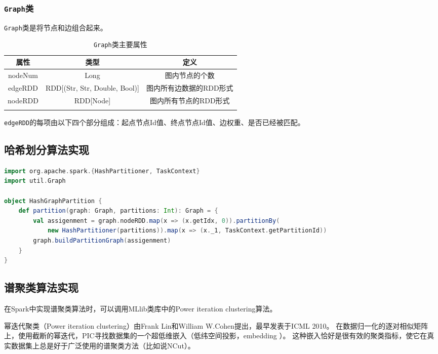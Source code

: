 \subsubsection{\texttt{Graph}类}

\texttt{Graph}类是将节点和边组合起来。

\begin{table}[htbp]
    \centering
    \caption{\texttt{Graph}类主要属性}
    \begin{tabular}{ccc}
        \hline
        属性& 类型 & 定义\\
        \hline
        nodeNum & Long & 图内节点的个数 \\
        edgeRDD & RDD[(Str, Str, Double, Bool)] & 图内所有边数据的RDD形式\\
        nodeRDD & RDD[Node] & 图内所有节点的RDD形式\\
        \hline
        \centering
    \end{tabular}
\end{table}

\texttt{edgeRDD}的每项由以下四个部分组成：起点节点Id值、终点节点Id值、边权重、是否已经被匹配。

\subsection{哈希划分算法实现}

\begin{lstlisting}[language=Scala]
import org.apache.spark.{HashPartitioner, TaskContext}
import util.Graph

object HashGraphPartition {
    def partition(graph: Graph, partitions: Int): Graph = {
        val assigenment = graph.nodeRDD.map(x => (x.getIdx, 0)).partitionBy(
            new HashPartitioner(partitions)).map(x => (x._1, TaskContext.getPartitionId))
        graph.buildPartitionGraph(assigenment)
    }
}
\end{lstlisting}

\subsection{谱聚类算法实现}

在Spark中实现谱聚类算法时，可以调用MLlib类库中的Power iteration clustering算法。

幂迭代聚类（Power iteration clustering）由Frank Lin和William W.Cohen提出，最早发表于ICML 2010。
在数据归一化的逐对相似矩阵上，使用截断的幂迭代，PIC寻找数据集的一个超低维嵌入（低纬空间投影，embedding ）。
这种嵌入恰好是很有效的聚类指标，使它在真实数据集上总是好于广泛使用的谱聚类方法（比如说NCut）。

